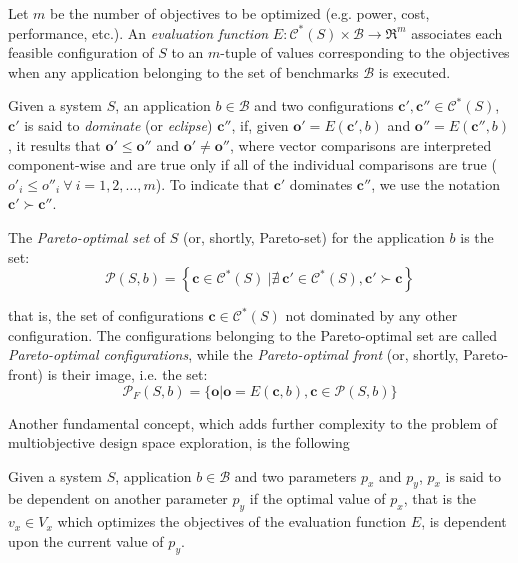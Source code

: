 Let $m$ be the number of objectives to be optimized (e.g. power,
cost, performance, etc.). An {\em evaluation function}
$E:\mathcal{C}^*(S)\times \mathcal{B} \longrightarrow \Re^m$ associates each feasible configuration of $S$ to
an $m$-tuple of values corresponding to the objectives when any application belonging to the set of benchmarks
$\mathcal{B}$ is executed.

Given a system $S$, an application $b \in \mathcal{B}$ and two
configurations $\mathbf{c}', \mathbf{c}'' \in \mathcal{C}^*(S)$,
$\mathbf{c}'$ is said to {\em dominate} (or {\em eclipse})
$\mathbf{c}''$, if, given $\mathbf{o}'=E(\mathbf{c}', b)$ and
$\mathbf{o}''=E(\mathbf{c}'', b)$, it results that $\mathbf{o}'
\leq \mathbf{o}''$ and $\mathbf{o}' \neq \mathbf{o}''$, where
vector comparisons are interpreted component-wise and are true
only if all of the individual comparisons are true ($o'_i \leq
o''_i \ \forall \ i = 1,2,\ldots,m$). To indicate that 
$\mathbf{c}'$ dominates $\mathbf{c}''$, we use the notation
$\mathbf{c}' \succ \mathbf{c}''$.

\begin{definition}
The {\em Pareto-optimal set} of $S$ (or, shortly, Pareto-set) for the application $b$ is the
set:
\[ \mathcal{P}(S,b) = \left\{ \mathbf{c} \in \mathcal{C}^*(S) \ | \nexists \ \mathbf{c}' \in \mathcal{C}^*(S), \mathbf{c}' \succ \mathbf{c} \right\} \]
\end{definition}
that is, the set of configurations $\mathbf{c} \in
\mathcal{C}^*(S)$ not dominated by any other configuration.
The configurations belonging to the Pareto-optimal set are called \emph{Pareto-optimal configurations}, while the {\em Pareto-optimal front} (or, shortly, Pareto-front) is their image, i.e. the set:
\[ \mathcal{P}_{F}(S,b) = \{ \mathbf{o} | \mathbf{o} = E(\mathbf{c},b), \mathbf{c} \in \mathcal{P}(S,b) \} \]

Another fundamental concept, which adds further complexity to the
problem of multiobjective design space exploration, is the following

\begin{definition}
Given a system $S$, application $b \in \mathcal{B}$ and two parameters
$p_x$ and $p_y$, $p_x$ is said to
be dependent on another parameter $p_y$ if the optimal value of $p_x$,
that is the $v_{x} \in V_x$ which optimizes the objectives of the
evaluation function $E$, is dependent upon the current value of $p_y$. 
\end{definition}

